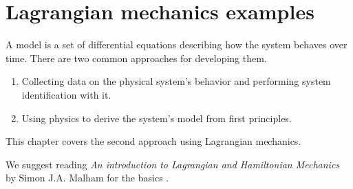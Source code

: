 
\chapter{Lagrangian mechanics examples}

A \gls{model} is a set of differential equations describing how the \gls{system}
behaves over time. There are two common approaches for developing them.
\begin{enumerate}
  \item Collecting data on the physical system's behavior and performing
    \gls{system} identification with it.
  \item Using physics to derive the \gls{system}'s model from first principles.
\end{enumerate}

This chapter covers the second approach using Lagrangian mechanics.

We suggest reading \textit{An introduction to Lagrangian and Hamiltonian
Mechanics} by Simon J.A. Malham for the basics
\cite{bib:an_intro_to_lagrangian_and_hamiltonian_mechanics}.

\renewcommand*{\chapterpath}{\partpath/lagrangian-mechanics-examples}



